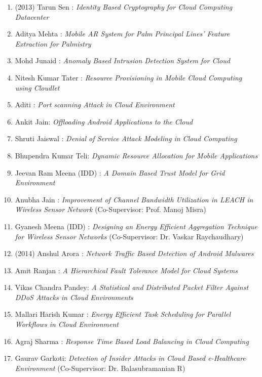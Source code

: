 \begin{enumerate}
\item	(2013) Tarun Sen : 	\textit{	Identity Based Cryptography for Cloud Computing Datacenter}	 
\item	Aditya Mehta : 	\textit{	Mobile AR System for Palm Principal Lines' Feature Extraction for Palmistry} 
\item		Mohd Junaid : 	\textit{	Anomaly Based Intrusion Detection System for Cloud}	
\item		Nitesh Kumar Tater : 	\textit{	Resource Provisioning in Mobile Cloud Computing using Cloudlet}
\item		Aditi : 	\textit{	Port scanning Attack in Cloud Environment} 
\item		Ankit Jain: 	\textit{	Offloading Android Applications to the Cloud}
\item		Shruti Jaiswal : 	\textit{	Denial of Service Attack Modeling in Cloud Computing}
\item		Bhupendra Kumar Teli: 	\textit{	Dynamic Resource Allocation for Mobile Applications}
\item		Jeevan Ram Meena (IDD) : 	\textit{	A Domain Based Trust Model for Grid Environment}
\item		Anubha Jain : 	\textit{	 Improvement of Channel Bandwidth Utilization in LEACH in Wireless Sensor Network} (Co-Supervisor:	Prof. Manoj Misra)	
\item		Gyanesh Meena (IDD) : 	\textit{	Designing an Energy Efficient Aggregation Technique for Wireless Sensor Networks} (Co-Supervisor: Dr. Vaskar Raychaudhary)



\item	(2014) Anshul Arora : 	\textit{	Network Traffic Based Detection of Android Malwares}	
\item		Amit Ranjan : 	\textit{	A Hierarchical Fault Tolerance Model for Cloud Systems}	
\item     Vikas Chandra Pandey: 	\textit{ A Statistical and Distributed Packet Filter Against DDoS Attacks in Cloud Environments} 
\item		Mallari Harish Kumar : 	\textit{	Energy Efficient Task Scheduling for Parallel Workflows in Cloud Environment}	
\item		Agraj Sharma : 	\textit{	Response Time Based Load Balancing in Cloud Computing} 
\item		Gaurav Garkoti: 	\textit{	Detection of Insider Attacks in Cloud Based e-Healthcare Environment} (Co-Supervisor: Dr. Balasubramanian R)


\end{enumerate}
